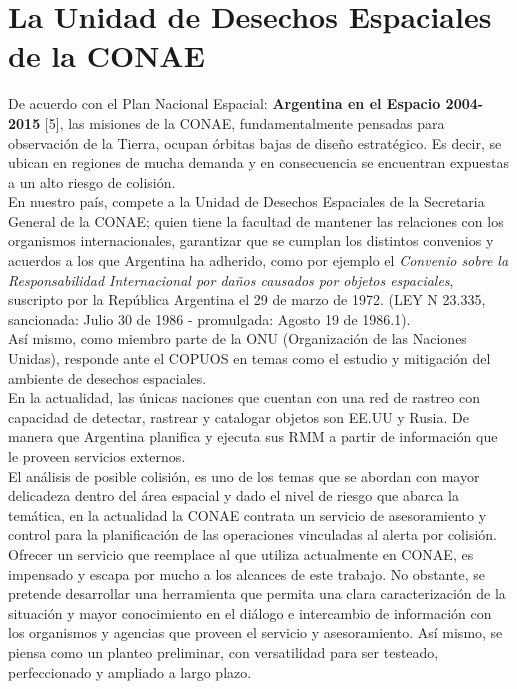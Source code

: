 \section{La Unidad de Desechos Espaciales de la CONAE}
De acuerdo con el Plan Nacional Espacial: {\bf{ Argentina en el Espacio 2004-2015}} [5], las misiones de la CONAE, fundamentalmente pensadas para observaci\'on de la Tierra, ocupan \'orbitas bajas de dise\~no estrat\'egico. Es decir, se ubican en regiones de mucha demanda y en consecuencia se encuentran expuestas a un alto riesgo de colisi\'on.\\
En nuestro pa\'is, compete a la Unidad de Desechos Espaciales de la Secretaria General de la CONAE; quien tiene la facultad de mantener las relaciones con los organismos internacionales, garantizar que se cumplan los distintos convenios y acuerdos a los que Argentina ha adherido, como por ejemplo el {\it{Convenio sobre la Responsabilidad Internacional por da\~nos causados por objetos espaciales}}, suscripto por la Rep\'ublica Argentina el 29 de marzo de 1972. (LEY N 23.335, sancionada: Julio 30 de 1986 - promulgada: Agosto 19 de 1986.1).\\
 As\'i mismo, como miembro parte de la ONU (Organizaci\'on de las Naciones Unidas), responde ante el \ac{COPUOS} en temas como el estudio y mitigaci\'on del ambiente de desechos espaciales.\\

	En la actualidad, las \'unicas naciones que cuentan con una red de rastreo con capacidad de detectar, rastrear y catalogar objetos son EE.UU y Rusia. De manera que Argentina planifica y ejecuta sus RMM a partir de informaci\'on que le proveen servicios externos.\\

El an\'alisis de posible colisi\'on, es uno de los temas que se abordan con mayor delicadeza dentro del \'area espacial y dado el nivel de riesgo que abarca la tem\'atica, en la actualidad la CONAE contrata un servicio de asesoramiento y control para la planificaci\'on de las operaciones vinculadas al alerta por colisi\'on.\\
Ofrecer un servicio que reemplace al que utiliza actualmente en CONAE, es impensado y escapa por mucho a los alcances de este trabajo. No obstante, se pretende desarrollar una herramienta que permita una clara caracterizaci\'on de la situaci\'on y mayor conocimiento en el di\'alogo e intercambio de informaci\'on con los organismos y agencias que proveen el servicio y asesoramiento. As\'i mismo, se piensa como un planteo preliminar, con versatilidad para ser testeado, perfeccionado y ampliado a largo plazo.\\

